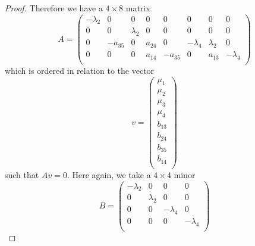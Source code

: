 \documentclass[12pt,fleqn]{article}
\begin{document}
\begin{proof}
Therefore we have a $4\times 8$ matrix \[
A=\begin{pmatrix}
-\lambda_2 & 0 & 0 & 0 & 0 & 0 & 0 & 0\\
0 & 0 & \lambda_2 & 0 & 0 & 0 & 0 & 0\\
0 & -a_{35} & 0 & a_{24} & 0 & -\lambda_4 & \lambda_2 & 0\\
0 & 0 & 0 & a_{14} & -a_{35} & 0 & a_{13} & -\lambda_4\\
\end{pmatrix}
\]
which is ordered in relation to the vector \[
v=\begin{pmatrix}
\mu_1\\
\mu_2\\
\mu_3\\
\mu_4\\
b_{13}\\
b_{24}\\
b_{35}\\
b_{14}\\
\end{pmatrix}
\]
such that $Av=0$. Here again, we take a $4\times 4$ minor \[B=\begin{pmatrix}
-\lambda_2 & 0 & 0 & 0\\
0 & \lambda_2 & 0 & 0\\
0 & 0 & -\lambda_4 & 0\\
0 & 0 & 0 & -\lambda_4\\
\end{pmatrix}\]

\end{proof}
\end{document}
